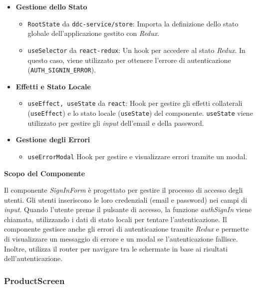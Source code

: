 \begin{itemize}
    \item \textbf{Gestione dello Stato}
    \begin{itemize}
        \item \texttt{RootState} da \texttt{ddc-service/store}: Importa la definizione dello stato globale dell'applicazione gestito con \textit{Redux}.
        \item \texttt{useSelector} da \texttt{react-redux}: Un hook per accedere al stato \textit{Redux}. In questo caso, viene utilizzato per ottenere l'errore di autenticazione (\texttt{AUTH\_SIGNIN\_ERROR}).
    \end{itemize}
    
    \item \textbf{Effetti e Stato Locale}
    \begin{itemize}
        \item \texttt{useEffect, useState} da \texttt{react}: Hook per gestire gli effetti collaterali (\texttt{useEffect}) e lo stato locale (\texttt{useState}) del componente. \texttt{useState} viene utilizzato per gestire gli \textit{input} dell'email e della password.
    \end{itemize}
    
    \item \textbf{Gestione degli Errori}
    \begin{itemize}
        \item \texttt{useErrorModal} Hook per gestire e visualizzare errori tramite un modal.
    \end{itemize}
\end{itemize}

\textbf{Scopo del Componente}

Il componente \textit{SignInForm} è progettato per gestire il processo di accesso degli utenti.
Gli utenti inseriscono le loro credenziali (email e password) nei campi di \textit{input}.
Quando l'utente preme il pulsante di accesso, la funzione \textit{authSignIn} viene chiamata, utilizzando i dati di stato locali per tentare l'autenticazione.
Il componente gestisce anche gli errori di autenticazione tramite \textit{Redux} e permette di visualizzare un messaggio di errore e un modal se l'autenticazione fallisce.
Inoltre, utilizza il router per navigare tra le schermate in base ai risultati dell'autenticazione.


\subsubsection{ProductScreen}

